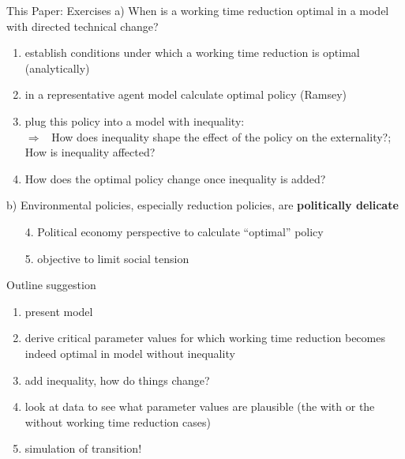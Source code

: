 \documentclass[11pt,aspectratio=169]{beamer}
\newcommand{\tr}[1]{\textcolor{blue}{#1}}
\newcommand{\ar}{$\Rightarrow$ \ }
\begin{document}
\begin{frame}{This Paper: Exercises}
	a) When is a working time reduction optimal in a model with directed technical change?
	\vspace{0mm}
	\begin{enumerate}
		\item establish conditions under which a working time reduction is optimal (analytically)
		\item in a representative agent model calculate optimal policy (Ramsey)
		\item plug this policy into a model with inequality: \\ 
		\ar How does inequality shape the effect of the policy on the externality?; How is inequality affected?
		\item How does the optimal policy change once inequality is added?
	\end{enumerate}
	b) Environmental policies, especially reduction policies, are \textbf{\alert{politically delicate}}
	\begin{enumerate}
		\item[4.] Political economy perspective to calculate ``optimal'' policy
		\item[5.] objective to limit social tension
	\end{enumerate}
\end{frame}

\begin{frame}{Outline suggestion}
\begin{enumerate}
\item present model
\item derive critical parameter values for which working time reduction becomes indeed optimal in model without inequality
\item add inequality, how do things change?
\item look at data to see what parameter values are plausible (the with or the without working time reduction cases)
\item simulation of transition! 
\end{enumerate}
\end{frame}
\end{document}
